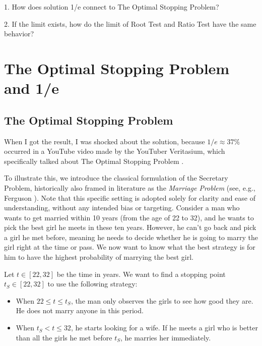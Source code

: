 \documentclass{article}
\begin{document}
1. How does solution 1/e connect to The Optimal Stopping Problem?

2. If the limit exists, how do the limit of Root Test and Ratio Test have the same behavior?
\section{The Optimal Stopping Problem and 1/e}
\subsection{The Optimal Stopping Problem}

When I got the result, I was shocked about the solution, because $1/e \approx 37\%$ occurred in a YouTube video made by the YouTuber Veritasium, which specifically talked about The Optimal Stopping Problem \cite{veritasium_37}.

To illustrate this, we introduce the classical formulation of the Secretary Problem, historically also framed in literature as the \textit{Marriage Problem} (see, e.g., Ferguson \cite{ferguson1989}). Note that this specific setting is adopted solely for clarity and ease of understanding, without any intended bias or targeting. Consider a man who wants to get married within 10 years (from the age of 22 to 32), and he wants to pick the best girl he meets in these ten years. However, he can't go back and pick a girl he met before, meaning he needs to decide whether he is going to marry the girl right at the time or pass. We now want to know what the best strategy is for him to have the highest probability of marrying the best girl.

Let $t \in [22, 32]$ be the time in years. We want to find a stopping point $t_S \in [22, 32]$ to use the following strategy:
\begin{itemize}[itemsep=4pt, topsep=4pt]
    \item When $22 \leq t \leq t_S$, the man only observes the girls to see how good they are. He does not marry anyone in this period.
    \item When $t_S < t \leq 32$, he starts looking for a wife. If he meets a girl who is better than all the girls he met before $t_S$, he marries her immediately.
\end{itemize}
\end{document}
